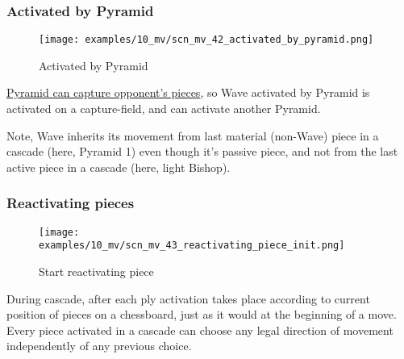 \subsubsection*{Activated by Pyramid}
\label{sec:Miranda's veil/Wave/Cascading Waves/Activated by Pyramid}

\vspace*{-1.4\baselineskip}
\noindent
\begin{figure}[!h]
\texttt{[image: examples/10\_mv/scn\_mv\_42\_activated\_by\_pyramid.png]}
\vspace*{-1.3\baselineskip}
\caption{Activated by Pyramid}
\label{fig:scn_mv_42_activated_by_pyramid}
\end{figure}

\vspace*{-0.3\baselineskip}
\hyperref[fig:scn_ma_02_pyramid_activated]{Pyramid can capture opponent's pieces},
so Wave activated by Pyramid is activated on a capture-field, and can activate
another Pyramid.

Note, Wave inherits its movement from last material (non-Wave) piece in a cascade
(here, Pyramid 1) even though it's passive piece, and not from the last active
piece in a cascade (here, light Bishop).

\clearpage %

\subsubsection*{Reactivating pieces}
\label{sec:Miranda's veil/Wave/Cascading Waves/Reactivating pieces}

\vspace*{-1.4\baselineskip}
\noindent
\begin{figure}[!h]
\texttt{[image: examples/10\_mv/scn\_mv\_43\_reactivating\_piece\_init.png]}
\caption{Start reactivating piece}
\label{fig:scn_mv_43_reactivating_piece_init}
\end{figure}

During cascade, after each ply activation takes place according to current position
of pieces on a chessboard, just as it would at the beginning of a move. Every piece
activated in a cascade can choose any legal direction of movement independently of
any previous choice.

